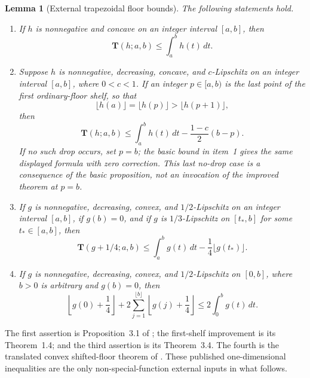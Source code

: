 \documentclass[11pt]{article}
\numberwithin{equation}{section}
\newtheorem{lemma}[theorem]{Lemma}
\theoremstyle{definition}
\theoremstyle{remark}
\begin{document}
\begin{lemma}[External trapezoidal floor bounds]
\label{lem:sc-external-floor-bounds}
The following statements hold.
\begin{enumerate}
  \item If \(h\) is nonnegative and concave on an integer interval
  \([a,b]\), then
  \begin{equation}
    \mathbf T(h;a,b)\le\int_a^bh(t)\,dt.
    \label{eq:sc-concave-floor-bound}
  \end{equation}
  \item Suppose \(h\) is nonnegative, decreasing, concave, and
  \(c\)-Lipschitz on an
  integer interval \([a,b]\), where \(0<c<1\).  If an integer
  \(p\in[a,b)\) is the last point of the first ordinary-floor shelf, so that
  \[
    \lfloor h(a)\rfloor=\lfloor h(p)\rfloor
    >\lfloor h(p+1)\rfloor,
  \]
  then
  \begin{equation}
    \mathbf T(h;a,b)
    \leq\int_a^b h(t)\,dt-
          \frac{1-c}{2}(b-p).
    \label{eq:sc-improved-concave-floor-bound}
  \end{equation}
  If no such drop occurs, set \(p=b\); the basic bound in item~1 gives
  the same displayed formula with zero correction.  This last no-drop case
  is a consequence of the basic proposition, not an invocation of the
  improved theorem at \(p=b\).
  \item If \(g\) is nonnegative, decreasing, convex, and
  \(1/2\)-Lipschitz on an integer interval \([a,b]\), if \(g(b)=0\), and if
  \(g\) is \(1/3\)-Lipschitz on \([t_*,b]\) for some
  \(t_*\in[a,b]\), then
  \begin{equation}
    \mathbf T(g+1/4;a,b)
    \le\int_a^bg(t)\,dt-\frac14\lfloor g(t_*)\rfloor.
    \label{eq:sc-improved-convex-floor-bound}
  \end{equation}
  \item If \(g\) is nonnegative, decreasing, convex, and
  \(1/2\)-Lipschitz on \([0,b]\), where \(b>0\) is arbitrary and \(g(b)=0\),
  then
  \begin{equation}
    \left\lfloor g(0)+\frac14\right\rfloor
    +2\sum_{j=1}^{\lfloor b\rfloor}
    \left\lfloor g(j)+\frac14\right\rfloor
    \le2\int_0^bg(t)\,dt.
    \label{eq:sc-convex-shifted-tail-bound}
  \end{equation}
\end{enumerate}
\end{lemma}

The first assertion is Proposition~3.1 of \cite{FLPSannuli}; the
first-shelf improvement is its Theorem~1.4; and the third assertion is its
Theorem~3.4.  The fourth is the translated convex shifted-floor theorem of
\cite{FLPSballs}.  These published one-dimensional inequalities are the only
non-special-function external inputs in what follows.
\end{document}
